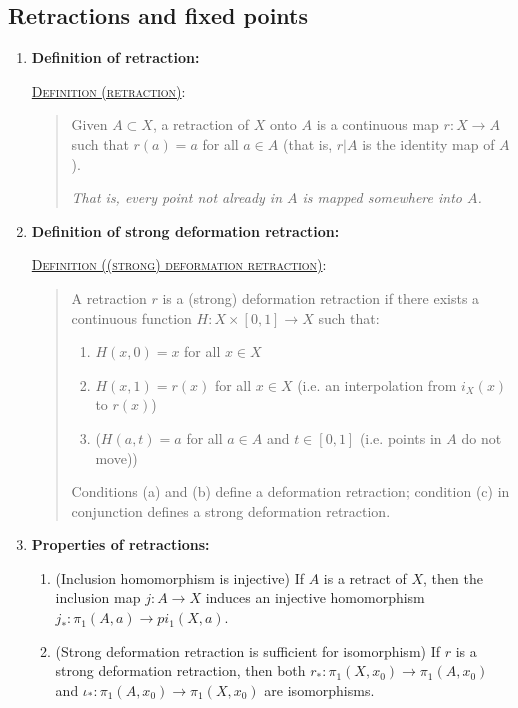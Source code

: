 \documentclass[letterpaper, 12pt]{article}
\newcommand{\defn}[2]{\textsc{\underline{Definition (#1)}:}\begin{quote} #2\end{quote}}
\begin{document}
    \subsection{Retractions and fixed points}
        \begin{enumerate}[resume]
        \item \textbf{Definition of retraction:}

            \defn{retraction}{Given $A\subset X$, a retraction of $X$ onto $A$ is a continuous map $r:X\to A$ such that $r(a)=a$ for all $a\in A$ (that is, $r|A$ is the identity map of $A$).

            \textit{That is, every point not already in $A$ is mapped somewhere into $A$.}}
        \item \textbf{Definition of strong deformation retraction:}

            \defn{(strong) deformation retraction}{A retraction $r$ is a (strong) deformation retraction if there exists a continuous function $H : X\times[0,1]\to X$ such that:
                \begin{enumerate}
                \item $H(x,0) = x$ for all $x\in X$
                \item $H(x,1) = r(x)$ for all $x\in X$ (i.e. an interpolation from $i_X(x)$ to $r(x)$)
                \item ($H(a,t) = a$ for all $a\in A$ and $t\in [0,1]$ (i.e. points in $A$ do not move))
                \end{enumerate}
                Conditions (a) and (b) define a deformation retraction; condition (c) in conjunction defines a strong deformation retraction.}
        \item \textbf{Properties of retractions:}
            \begin{enumerate}
            \item (Inclusion homomorphism is injective) If $A$ is a retract of $X$, then the inclusion map $j:A\to X$ induces an injective homomorphism $j_* : \pi_1(A,a) \to pi_1(X,a)$.
            \item (Strong deformation retraction is sufficient for isomorphism) If $r$ is a strong deformation retraction, then both $r_* : \pi_1(X, x_0) \to \pi_1(A, x_0)$ and $\iota_* : \pi_1(A, x_0) \to \pi_1(X, x_0)$ are isomorphisms.


\end{enumerate}
\end{enumerate}
\end{document}
